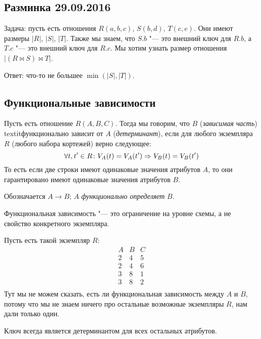 \subsection{Разминка 29.09.2016}

Задача: пусть есть отношения $R(a, b, c)$, $S(b, d)$, $T(c, e)$.
Они имеют размеры $|R|$, $|S|$, $|T|$.
Также мы знаем, что $S.b$ "--- это внешний ключ для $R.b$,
а $T.c$ "--- это внешний ключ для $R.c$.
Мы хотим узнать размер отношения $|(R \bowtie S) \bowtie T|$.

Ответ: что-то не большее $\min(|S|, |T|)$.

\subsection{Функциональные зависимости}
	\begin{Def}
		Пусть есть отношение $R(A, B, C)$.
		Тогда мы говорим, что $B$ (\textit{зависимая часть})
		textit{функционально зависит} от $A$ (\textit{детерминант}), если для любого экземпляра
		$R$ (любого набора кортежей) верно следующее:
		\[ \forall t, t' \in R \colon V_A(t) = V_A(t') \Rightarrow V_B(t) = V_B(t') \]
		То есть если две строки имеют одинаковые
		значения атрибутов $A$, то они гарантировано имеют одинаковые значения
		атрибутов $B$.
	\end{Def}
	\begin{Rem}
		Обозначается $A \rightarrow B$; $A$ \textit{функционально определяет} $B$.
	\end{Rem}
	\begin{Rem}
		Функциональная зависимость "--- это ограничение на уровне схемы,
		а не свойство конкретного экземпляра.
	\end{Rem}
	\begin{exmp}
		Пусть есть такой экземпляр $R$:
		\[
			\begin{matrix}
				A & B & C \\
				2 & 4 & 5 \\
				2 & 4 & 6 \\
				3 & 8 & 1 \\
				3 & 8 & 2 \\
			\end{matrix}
		\]
		Тут мы не можем сказать, есть ли функциональная зависимость между $A$ и $B$,
		потому что мы не знаем ничего про остальные возможные экземпляры $R$, нам дали только один.
	\end{exmp}
	\begin{exmp}
		Ключ всегда является детерминантом для всех остальных атрибутов.
	\end{exmp}

